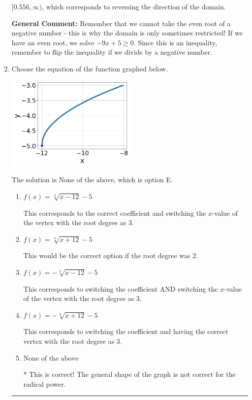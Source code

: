 \documentclass{extbook}[14pt]
\newcommand{\litem}[1]{\item #1

\rule{\textwidth}{0.4pt}}
\begin{document}
\begin{enumerate}
{\begin{enumerate}[label=\Alph*.]
 $[0.556, \infty)$, which corresponds to reversing the direction of the domain.
\end{enumerate}

\textbf{General Comment:} Remember that we cannot take the even root of a negative number - this is why the domain is only sometimes restricted! If we have an even root, we solve $-9 x + 5 \geq 0$. Since this is an inequality, remember to flip the inequality if we divide by a negative number.
}
\litem{
Choose the equation of the function graphed below.

\begin{center}
    \includegraphics[width=0.5\textwidth]{../Figures/radicalGraphToEquationCopyB.png}
\end{center}




The solution is \( \text{None of the above} \), which is option E.\begin{enumerate}[label=\Alph*.]
\item \( f(x) = \sqrt[3]{x - 12} - 5 \)

This corresponds to the correct coefficient and switching the $x$-value of the vertex with the root degree as $3$.
\item \( f(x) = \sqrt[3]{x + 12} - 5 \)

This would be the correct option if the root degree was $2$.
\item \( f(x) = - \sqrt[3]{x - 12} - 5 \)

This corresponds to switching the coefficient AND switching the $x$-value of the vertex with the root degree as $3$.
\item \( f(x) = - \sqrt[3]{x + 12} - 5 \)

This corresponds to switching the coefficient and having the correct vertex with the root degree as $3$.
\item \( \text{None of the above} \)

* This is correct! The general shape of the graph is not correct for the radical power.
\end{enumerate}

}
\end{enumerate}
\end{document}
